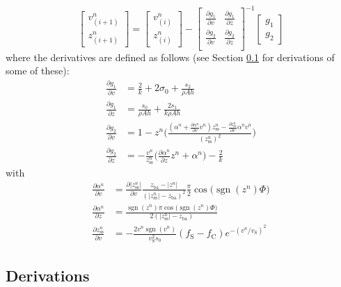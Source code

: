\documentclass{article}
\DeclareMathOperator{\sgn}{sgn}
\begin{document}
\begin{equation}
    \begin{bmatrix}
    v_{(i+1)}^n\\
    z_{(i+1)}^n
    \end{bmatrix}
    =
    \begin{bmatrix}
    v_{(i)}^n\\
    z_{(i)}^n
    \end{bmatrix}
    -
    \begin{bmatrix}
    \frac{\partial g_1}{\partial v} & \frac{\partial g_1}{\partial z}\\
    \frac{\partial g_2}{\partial v} & \frac{\partial g_2}{\partial z}\\
    \end{bmatrix}^{-1}
    \begin{bmatrix}
    g_1\\
    g_2
    \end{bmatrix}
\end{equation}
where the derivatives are defined as follows (see Section \ref{sec:derivations} for derivations of some of these): 
\begin{align}
    \frac{\partial g_1}{\partial v} &= \frac{2}{k} + 2\sigma_0 + \frac{s_2}{\rho Ah}\\
    \frac{\partial g_1}{\partial z} &= \frac{s_0}{\rho A h} + \frac{2s_1}{k\rho Ah}\\
    \frac{\partial g_2}{\partial v} &=  1-z^n\Bigg(\frac{(\alpha^n+\frac{\partial \alpha^n}{\partial v}v^n)z_\text{ss}^n - \frac{\partial z_\text{ss}^n}{\partial v}\alpha^n v^n}{(z_\text{ss}^n)^2}\Bigg)\label{eq:g2v}
    \\\frac{\partial g_2}{\partial z}&= -\frac{v^n}{z_\text{ss}^n}\bigg(\frac{\partial \alpha^n}{\partial z}z^n + \alpha^n\bigg)-\frac{2}{k}
\end{align}
with
\begin{align}
    \frac{\partial\alpha^n}{\partial v} &=\frac{\partial |z_\text{ss}^n|}{\partial v}\frac{z_\text{ba} - |z^n|}{(|z_\text{ss}^n| - z_\text{ba})^2}\frac{\pi}{2}\cos\big(\sgn(z^n)\Phi\big)\\
    \frac{\partial\alpha^n}{\partial z}&=\frac{\sgn(z^n)\pi\cos\big(\sgn(z^n)\Phi\big)}{2(|z_\text{ss}^n|-z_\text{ba})}\\
    \frac{\partial z_\text{ss}^n}{\partial v} &= -\frac{2 v^n \sgn(v^n)}{v_\text{S}^2 s_0}(f_\text{S}-f_\text{C})e^{-(v^n/v_\text{S})^2}
\end{align}
\subsection{Derivations}\label{sec:derivations}
\end{document}
